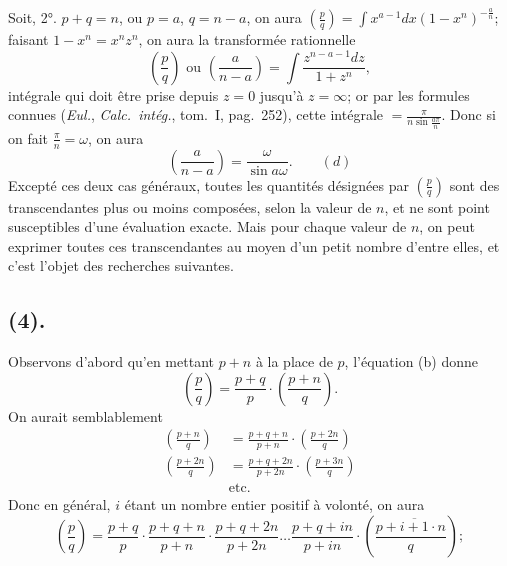 \documentclass{article}
\begin{document}
Soit, 2°. $p+q=n$, ou $p=a$, $q=n-a$, on aura $\left(\frac{p}{q}\right)=\displaystyle\int x^{a-1}dx(1-x^{n})^{-\frac{a}{n}}$; faisant $1-x^{n}=x^{n}z^{n}$, on aura la transformée rationnelle
\[ \left(\frac{p}{q}\right)\text{ ou }\left(\frac{a}{n-a}\right)=\int\frac{z^{n-a-1}dz}{1+z^{n}}, \]
intégrale qui doit être prise depuis $z=0$ jusqu'à $z=\infty$; or par les formules connues (\emph{Eul.}, \emph{Calc.\ intég.}, tom.~I, pag.~252), cette intégrale $=\frac{\pi}{n\sin\frac{a\pi}{n}}$. Donc si on fait $\frac{\pi}{n}=\omega$, on aura
\[ \left(\frac{a}{n-a}\right)=\frac{\omega}{\sin a\omega}.\qquad(d) \]
Excepté ces deux cas généraux, toutes les quantités désignées par $\left(\frac{p}{q}\right)$ sont des transcendantes plus ou moins composées, selon la valeur de $n$, et ne sont point susceptibles d'une évaluation exacte. Mais pour chaque valeur de $n$, on peut exprimer toutes ces transcendantes au moyen d'un petit nombre d'entre elles, et c'est l'objet des recherches suivantes.

\subsection*{(4).}

Observons d'abord qu'en mettant $p+n$ à la place de $p$, l'équation (b) donne
\[ \left(\frac{p}{q}\right)=\frac{p+q}{p}\cdot\left(\frac{p+n}{q}\right). \]
On aurait semblablement
\[ \begin{aligned} \left(\frac{p+n}{q}\right)&=\frac{p+q+n}{p+n}\cdot\left(\frac{p+2n}{q}\right)\\ \left(\frac{p+2n}{q}\right)&=\frac{p+q+2n}{p+2n}\cdot\left(\frac{p+3n}{q}\right)\\ &\text{etc.} \end{aligned} \]
Donc en général, $i$ étant un nombre entier positif à volonté, on aura
\[ \left(\frac{p}{q}\right)=\frac{p+q}{p}\cdot\frac{p+q+n}{p+n}\cdot\frac{p+q+2n}{p+2n}\ldots\frac{p+q+in}{p+in}\cdot\left(\frac{p+\overline{i+1}\cdot n}{q}\right); \]
\end{document}
